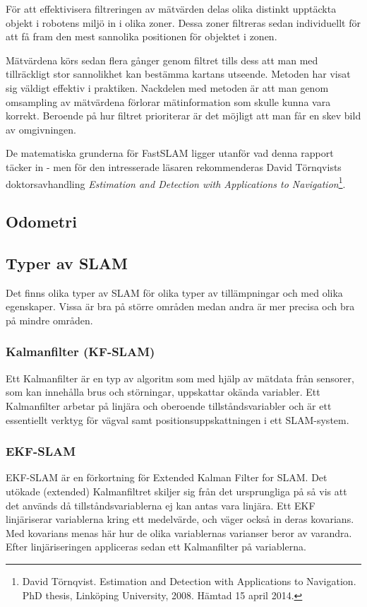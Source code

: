 \documentclass[a4paper,12pt,fleqn]{article}
\begin{document}
För att effektivisera filtreringen av mätvärden delas olika distinkt upptäckta objekt i robotens miljö in i olika zoner. Dessa zoner filtreras sedan individuellt för att få fram den mest sannolika positionen för objektet i zonen. 

Mätvärdena körs sedan flera gånger genom filtret tills dess att man med tillräckligt stor sannolikhet kan bestämma kartans utseende. Metoden har visat sig väldigt effektiv i praktiken. Nackdelen med metoden är att man genom omsampling av mätvärdena förlorar mätinformation som skulle kunna vara korrekt. Beroende på hur filtret prioriterar är det möjligt att man får en skev bild av omgivningen.

De matematiska grunderna för FastSLAM ligger utanför vad denna rapport täcker in - men för den intresserade läsaren rekommenderas David Törnqvists doktorsavhandling \textit{Estimation and Detection with Applications to Navigation}\footnote{David Törnqvist. Estimation and Detection with Applications to Navigation. PhD thesis, Linköping University, 2008. Hämtad 15 april 2014.}.

\subsection{Odometri}



\newpage


\subsection{Typer av SLAM}
Det finns olika typer av SLAM för olika typer av tillämpningar och med olika egenskaper. Vissa är bra på större områden medan andra är mer precisa och bra på mindre områden. 

\subsubsection{Kalmanfilter (KF-SLAM)}
Ett Kalmanfilter är en typ av algoritm som med hjälp av mätdata från sensorer, som kan innehålla brus och störningar, uppskattar okända variabler. Ett Kalmanfilter arbetar på linjära och oberoende tillståndsvariabler och är ett essentiellt verktyg för vägval samt positionsuppskattningen i ett SLAM-system. 

\subsubsection{EKF-SLAM} 
EKF-SLAM är en förkortning för Extended Kalman Filter for SLAM. Det utökade (extended) Kalmanfiltret skiljer sig från det ursprungliga på så vis att det används då tillståndsvariablerna ej kan antas vara linjära. Ett EKF linjäriserar variablerna kring ett medelvärde, och väger också in deras kovarians. Med kovarians menas här hur de olika variablernas varianser beror av varandra. Efter linjäriseringen appliceras sedan ett Kalmanfilter på variablerna.
\end{document}
